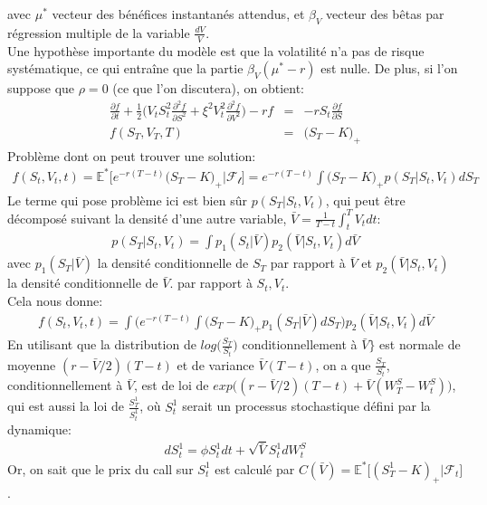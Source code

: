 \documentclass{report}
\begin{document}
avec $\mu^*$ vecteur des bénéfices instantanés attendus, et $\beta_V$ vecteur des bêtas par régression multiple de la variable $\frac{dV}{V}$.\\
Une hypothèse importante  du modèle est que la volatilité n’a pas de risque systématique, ce qui entraîne que la partie $\beta_V(\mu^*- r)$ est nulle. De plus, si l'on suppose que $\rho = 0$ (ce que l'on discutera), on obtient:
\begin{eqnarray*}
\frac{\partial f}{\partial t} + \frac{1}{2}\Big(V_t S_t^2 \frac{\partial^2 f}{\partial S^2} + \xi^2 V_t^2\frac{\partial^2 f}{\partial V^2}\Big) -rf &=& -rS_t\frac{\partial f}{\partial S}\\
f(S_T, V_T, T) &=& \big(S_T - K\big)_+
\end{eqnarray*}
Problème dont on peut trouver une solution:
\begin{eqnarray*}
f(S_t, V_t, t) = \mathbb{E}^*\Big[e^{-r(T-t)}\big(S_T-K\big)_+ \big| \mathcal{F_t}\Big] = e^{-r(T-t)}\int{\big(S_T-K\big)_+ p(S_T | S_t, V_t)dS_T}
\end{eqnarray*}
Le terme qui pose problème ici est bien sûr $p(S_T | S_t, V_t)$, qui peut être décomposé suivant la densité d'une autre variable, $\bar{V} = \frac{1}{T-t}\int_t^T{V_tdt}$:
\begin{eqnarray*}
p(S_T | S_t, V_t) = \int{p_1(S_t | \bar{V})p_2(\bar{V} | S_t, V_t)d\bar{V}}
\end{eqnarray*}
avec $p_1(S_T | \bar{V})$ la densité conditionnelle de $S_T$ par rapport à $\bar{V}$ et $p_2(\bar{V} | S_t, V_t)$ la densité conditionnelle de $\bar{V}$. par rapport à $S_t, V_t$.\\
Cela nous donne:
\begin{eqnarray*}
f(S_t, V_t, t) = \int\Big(	 e^{-r(T-t)}\int{\big(S_T-K\big)_+p_1(S_T | \bar{V})dS_T\Big)p_2(\bar{V} | S_t, V_t)d\bar{V}}
\end{eqnarray*}
En utilisant que la distribution de $log\big(\frac{S_T}{S_t}\big)$ conditionnellement à $\bar{V}\}$ est normale de moyenne $(r - \bar{V}/2)(T-t)$ et de variance $\bar{V}(T-t)$, on a que $\frac{S_T}{S_t}$, conditionnellement à $\bar{V}$, est de loi de $exp\big((r-\bar{V}/2)(T-t) + \bar{V}(W^S_T - W^S_t)\big)$, qui est aussi la loi de $\frac{S^1_T}{S^1_t}$, où $S^1_t$ serait un processus stochastique défini par la dynamique:
\begin{eqnarray*}
dS^1_t = \phi S^1_t dt + \sqrt{\bar{V}}S^1_t dW^S_t
\end{eqnarray*}
Or, on sait que le prix du call sur $S^1_t$ est calculé par $C(\bar{V}) = \mathbb{E}^*\big[(S^1_T-K)_+ | \mathcal{F}_t\big]$ .\\
\end{document}
